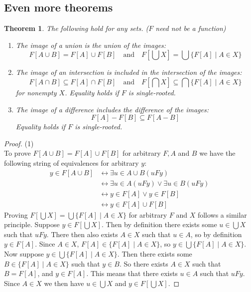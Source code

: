\documentclass{report}
\newtheorem{theorem}[theo]{Theorem}
\begin{document}
\subsection{Even more theorems}
\begin{theorem}
The following hold for any sets. ($F$ need not be a function)
\begin{enumerate}
\item The image of a union is the union of the images:
\begin{equation*}
F[A\cup B]=F[A]\cup F[B]\quad\text{and}\quad F[\bigcup X]=\bigcup\{F[A]\mid A\in X\}
\end{equation*}
\item The image of an intersection is included in the intersection of the images:
\begin{equation*}
F[A\cap B]\subseteq F[A]\cap F[B]\quad\text{and}\quad F[\bigcap X]\subseteq\bigcap\{F[A]\mid A\in X\}
\end{equation*}
for nonempty $X$. Equality holds if $F$ is single-rooted.
\item The image of a difference includes the difference of the images:
\begin{equation*}
F[A]-F[B]\subseteq F[A-B]
\end{equation*}
Equality holds if $F$ is single-rooted.
\end{enumerate}
\end{theorem}
\begin{proof}(1)\\
\indent To prove $F[A\cup B]=F[A]\cup F[B]$ for arbitrary $F,A$ and $B$ we have the following string of equivalences for arbitrary $y$:
\begin{align*}
y\in F[A\cup B]&\leftrightarrow\exists u\in A\cup B(uFy)\\
&\leftrightarrow\exists u\in A(uFy)\lor\exists u\in B(uFy)\\
&\leftrightarrow y\in F[A]\lor y\in F[B]\\
&\leftrightarrow y\in F[A]\cup F[B]
\end{align*}
\indent Proving $F[\bigcup X]=\bigcup\{F[A]\mid A\in X\}$ for arbitrary $F$ and $X$ follows a similar principle. Suppose $y\in F[\bigcup X]$. Then by definition there exists some $u\in\bigcup X$ 
such that $uFy$. There then also exists $A\in X$ such that $u\in A$, so by definition $y\in F[A]$.
Since $A\in X$, $F[A]\in\{F[A]\mid A\in X\}$, so $y\in\bigcup\{F[A]\mid A\in X\}$.\\
\indent Now suppose $y\in\bigcup\{F[A]\mid A\in X\}$. Then there exists some $B\in\{F[A]\mid A\in X\}$ such that $y\in B$. So there exists $A\in X$ such that $B=F[A]$, and $y\in F[A]$. 
This means that there exists $u\in A$ such that $uFy$. Since $A\in X$ we then have $u\in\bigcup X$ and $y\in F[\bigcup X]$.
\end{proof}
\end{document}

